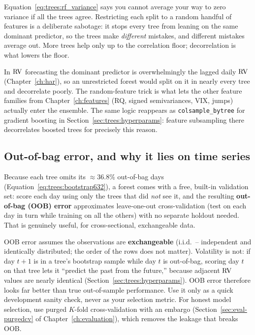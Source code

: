 \begin{intuition}
Equation~\ref{eq:trees:rf_variance} says you cannot average your way to zero
variance if all the trees agree.  Restricting each split to a random handful
of features is a deliberate sabotage: it stops every tree from leaning on the
same dominant predictor, so the trees make \emph{different} mistakes, and
different mistakes average out.  More trees help only up to the correlation
floor; decorrelation is what lowers the floor.
\end{intuition}

\begin{projectconnection}
In $\operatorname{RV}$ forecasting the dominant predictor is overwhelmingly the lagged
daily $\operatorname{RV}$ (Chapter~\ref{ch:har}), so an unrestricted forest would split on
it in nearly every tree and decorrelate poorly.  The random-feature trick is
what lets the other feature families from Chapter~\ref{ch:features} (RQ,
signed semivariances, VIX, jumps) actually enter the ensemble.  The same
logic reappears as \texttt{colsample\_bytree} for gradient boosting in
Section~\ref{sec:trees:hyperparams}: feature subsampling there decorrelates
boosted trees for precisely this reason.
\end{projectconnection}

\subsection{Out-of-bag error, and why it lies on time series}

Because each tree omits its $\approx 36.8\%$ out-of-bag days
(Equation~\ref{eq:trees:bootstrap632}), a forest comes with a free,
built-in validation set: score each day using only the trees that did
\emph{not} see it, and the resulting \textbf{out-of-bag (OOB) error}
approximates leave-one-out cross-validation (test on each day in turn while
training on all the others) with no separate holdout needed.
That is genuinely useful, for cross-sectional, exchangeable data.

\begin{warning}
OOB error assumes the observations are \textbf{exchangeable}
(i.i.d.\ -- independent and identically distributed; the order of the rows
does not matter).
Volatility is not: if day $t{+}1$ is in a tree's bootstrap sample while day
$t$ is out-of-bag, scoring day $t$ on that tree lets it ``predict the past
from the future,'' because adjacent $\operatorname{RV}$ values are nearly identical
(Section~\ref{sec:trees:hyperparams}).  OOB error therefore looks far better
than true out-of-sample performance.  Use it only as a quick development
sanity check, never as your selection metric.  For honest model selection,
use purged $K$-fold cross-validation with an embargo
(Section~\ref{sec:eval-purgedcv} of Chapter~\ref{ch:evaluation}), which
removes the leakage that breaks OOB.
\end{warning}




